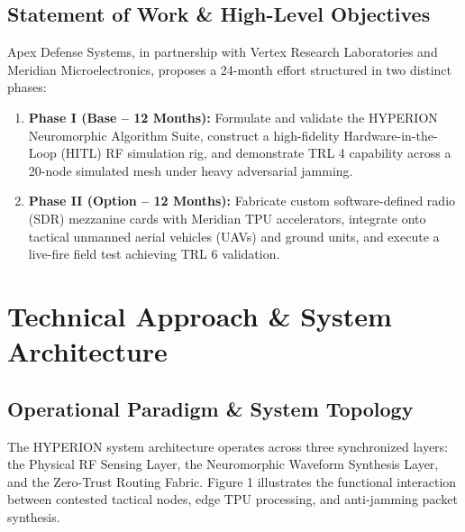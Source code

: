 \documentclass[10pt,a4paper]{article}
\begin{document}
\vspace{4pt}

\subsection{Statement of Work \& High-Level Objectives}
Apex Defense Systems, in partnership with Vertex Research Laboratories and Meridian Microelectronics, proposes a 24-month effort structured in two distinct phases:
\begin{enumerate}[label=\textbf{Objective \arabic*:},leftmargin=65pt,itemsep=1pt]
  \item \textbf{Phase I (Base -- 12 Months):} Formulate and validate the HYPERION Neuromorphic Algorithm Suite, construct a high-fidelity Hardware-in-the-Loop (HITL) RF simulation rig, and demonstrate TRL 4 capability across a 20-node simulated mesh under heavy adversarial jamming.
  \item \textbf{Phase II (Option -- 12 Months):} Fabricate custom software-defined radio (SDR) mezzanine cards with Meridian TPU accelerators, integrate onto tactical unmanned aerial vehicles (UAVs) and ground units, and execute a live-fire field test achieving TRL 6 validation.
\end{enumerate}

\newpage

\section{Technical Approach \& System Architecture}

\subsection{Operational Paradigm \& System Topology}
The HYPERION system architecture operates across three synchronized layers: the Physical RF Sensing Layer, the Neuromorphic Waveform Synthesis Layer, and the Zero-Trust Routing Fabric. Figure 1 illustrates the functional interaction between contested tactical nodes, edge TPU processing, and anti-jamming packet synthesis.

\vspace{3pt}
\end{document}
